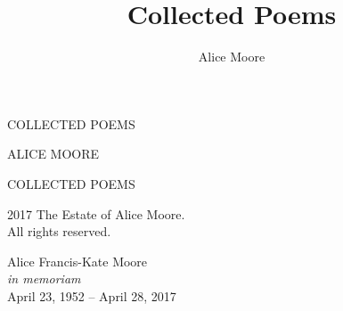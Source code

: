\documentclass[twoside,openright,final,11pt]{memoir}
\title{Collected Poems}
\author{Alice Moore}
\date{}
\begin{document}
\setlength\epigraphwidth{5cm}
\setlength\epigraphrule{0pt}
\epigraphfontsize{\footnotesize}

\setlength\vgap{2.5em}
\setlength\vleftskip{0.5em}

\PlainPoemTitle

\renewcommand{\printPoemTitletitle}[1]{\PoemTitlefont \uppercase{#1}}

\pagestyle{empty}

\frontmatter

\begin{titlingpage}
\begingroup
\newlength{\drop}
\setlength{\drop}{0.12\textheight}
\vspace*{\drop}
\begin{center}
{\noindent\Huge \textsc{COLLECTED POEMS}}\par
\vspace*{3\drop}
{\noindent\large \textsc{ALICE MOORE}}
\end{center}
\endgroup

\clearpage

\begingroup
\footnotesize
\begin{flushleft}
\textsc{COLLECTED POEMS}

\textcopyright{} 2017 The Estate of Alice Moore.\\
All rights reserved.
\end{flushleft}
\endgroup
\end{titlingpage}

\begingroup
\clearpage
\null\vspace{0.3\textheight}
\begin{center}
Alice Francis-Kate Moore\\
\textit{in memoriam}\\
April 23, 1952 -- April 28, 2017
\end{center}
\vfill\cleardoublepage
\endgroup

\setlength{\cftsectionindent}{3.8em}
\tableofcontents*
\clearpage

\renewcommand*{\printbookname}{}
\renewcommand*{\printbooknum}{}
\renewcommand*{\printpartnum}{}
\renewcommand*{\printpartname}{}

\renewcommand{\booktitlefont}{\normalfont\Huge\scshape}


\mainmatter
\pagestyle{myheadings}
\end{document}
